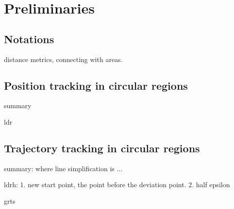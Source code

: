 



\section{Preliminaries}
\label{sec-pre}

\subsection{Notations}
distance metrics, connecting with areas.

\subsection{Position tracking in circular regions}
summary

ldr

\subsection{Trajectory tracking in circular regions}
summary: 
where line simplification is ...

ldrh: 1. new start point, the point before the deviation point. 2. half epsilon

grts




